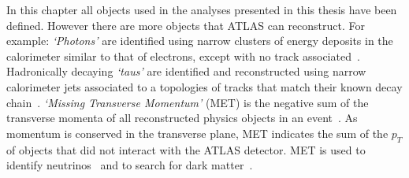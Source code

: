 In this chapter all objects used in the analyses presented in this thesis have been defined.
However there are more objects that ATLAS can reconstruct. For example:
\textit{`Photons'} are identified using narrow clusters of energy deposits in the calorimeter similar to that of electrons,
  except with no track associated~\cite{obj-photons}. %
 Hadronically decaying \textit{`taus'} are identified and reconstructed using narrow calorimeter jets
 associated to a topologies of tracks that match their known decay chain~\cite{obj-taus}.
 \textit{`Missing Transverse Momentum'} (MET) is the negative sum of the transverse momenta of all reconstructed physics objects in an event~\cite{obj-met}.
 As momentum is conserved in the transverse plane, MET indicates the sum of the $p_T$ of objects that did not interact with the ATLAS detector.
  MET is used to identify neutrinos~\cite{obj-Hbb} and to search for dark matter~\cite{obj-met_monoJet}.
